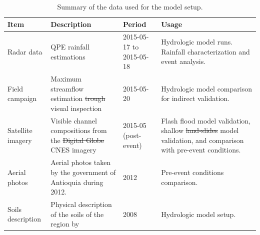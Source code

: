 \documentclass[hess, manuscript]{copernicus}
\providecommand{\DIFadd}[1]{{\protect\color{blue}\uwave{#1}}} %
\providecommand{\DIFdel}[1]{{\protect\color{red}\sout{#1}}}                      %
\providecommand{\DIFaddFL}[1]{\DIFadd{#1}} %
\providecommand{\DIFdelFL}[1]{\DIFdel{#1}} %
\providecommand{\DIFaddbeginFL}{} %
\providecommand{\DIFaddendFL}{} %
\providecommand{\DIFdelbeginFL}{} %
\providecommand{\DIFdelendFL}{} %
\begin{document}
    \begin{table}[]
        \centering
        \begin{tabularx}{\textwidth}{p{2.5cm} p{4cm} p{2cm} p{4cm} }
    \hline 
    Item & Description & Period & Usage \\
    \hline
Radar data & QPE rainfall estimations & 2015-05-17 to 2015-05-18 & Hydrologic model runs. Rainfall characterization and event analysis. \\
Field campaign & Maximum streamflow estimation \DIFdelbeginFL \DIFdelFL{trough }\DIFdelendFL \DIFaddbeginFL \DIFaddFL{through }\DIFaddendFL visual inspection & 2015-05-20 & Hydrologic model comparison for indirect validation. \\
Satellite imagery & Visible channel compositions from the \DIFdelbeginFL \DIFdelFL{Digital Globe }\DIFdelendFL \DIFaddbeginFL \DIFaddFL{DigitalGlobe }\DIFaddendFL CNES imagery & 2015-05 (post-event) & Flash flood model validation, shallow \DIFdelbeginFL \DIFdelFL{land-slides }\DIFdelendFL \DIFaddbeginFL \DIFaddFL{landslides }\DIFaddendFL model validation, and comparison with pre-event conditions. \\
Aerial photos & Aerial photos taken by the government of Antioquia during 2012. & 2012 & Pre-event conditions comparison. \\
Soils description & Physical description of the soils of the region by \cite{Osorio2008} & 2008 & Hydrologic model setup. \\
\hline
\end{tabularx}
        \caption{Summary of the data used for the model setup.}
        \label{tab:data}
    \end{table}
\end{document}
